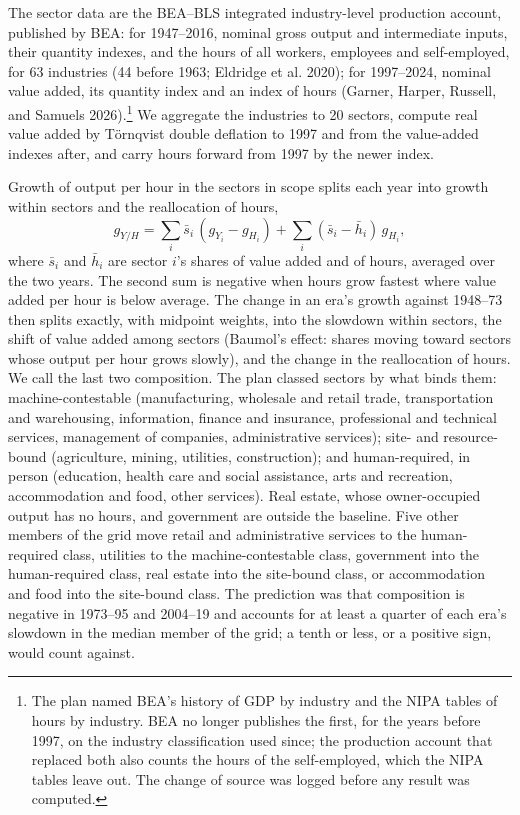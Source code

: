 \documentclass[12pt]{article}
\theoremstyle{plain}
\begin{document}
The sector data are the BEA--BLS integrated industry-level production account, published by BEA: for 1947--2016, nominal gross output and intermediate inputs, their quantity indexes, and the hours of all workers, employees and self-employed, for 63 industries (44 before 1963; Eldridge et al. 2020); for 1997--2024, nominal value added, its quantity index and an index of hours (Garner, Harper, Russell, and Samuels 2026).\footnote{The plan named BEA's history of GDP by industry and the NIPA tables of hours by industry. BEA no longer publishes the first, for the years before 1997, on the industry classification used since; the production account that replaced both also counts the hours of the self-employed, which the NIPA tables leave out. The change of source was logged before any result was computed.} We aggregate the industries to 20 sectors, compute real value added by Törnqvist double deflation to 1997 and from the value-added indexes after, and carry hours forward from 1997 by the newer index.

Growth of output per hour in the sectors in scope splits each year into growth within sectors and the reallocation of hours,
\begin{equation}\label{eq:14}
g_{Y/H}=\sum_i\bar s_i\,(g_{Y_i}-g_{H_i})+\sum_i(\bar s_i-\bar h_i)\,g_{H_i},
\end{equation}
where $\bar s_i$ and $\bar h_i$ are sector $i$'s shares of value added and of hours, averaged over the two years. The second sum is negative when hours grow fastest where value added per hour is below average. The change in an era's growth against 1948--73 then splits exactly, with midpoint weights, into the slowdown within sectors, the shift of value added among sectors (Baumol's effect: shares moving toward sectors whose output per hour grows slowly), and the change in the reallocation of hours. We call the last two composition. The plan classed sectors by what binds them: machine-contestable (manufacturing, wholesale and retail trade, transportation and warehousing, information, finance and insurance, professional and technical services, management of companies, administrative services); site- and resource-bound (agriculture, mining, utilities, construction); and human-required, in person (education, health care and social assistance, arts and recreation, accommodation and food, other services). Real estate, whose owner-occupied output has no hours, and government are outside the baseline. Five other members of the grid move retail and administrative services to the human-required class, utilities to the machine-contestable class, government into the human-required class, real estate into the site-bound class, or accommodation and food into the site-bound class. The prediction was that composition is negative in 1973--95 and 2004--19 and accounts for at least a quarter of each era's slowdown in the median member of the grid; a tenth or less, or a positive sign, would count against.
\end{document}
